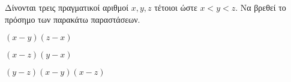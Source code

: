 Δίνονται τρεις πραγματικοί αριθμοί $ x,y,z $ τέτοιοι ώστε $ x<y<z $. Να βρεθεί το πρόσημο των παρακάτω παραστάσεων.
\begin{alist}
\item $ (x-y)(z-x) $
\item $ (x-z)(y-x) $
\item $ (y-z)(x-y)(x-z) $
\end{alist}

